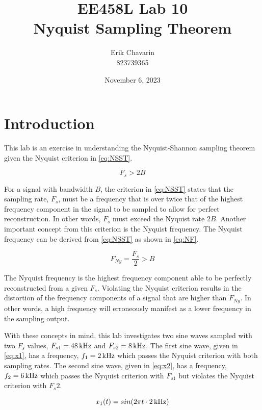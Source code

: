 \documentclass[a4paper,12pt]{article}
\title{%
  EE458L Lab 10 \\
  \large Nyquist Sampling Theorem
  }
\newcommand{\Hz}[1]{%
    \ifcase#1
        \relax
    \or
        \,\text{Hz}
    \or
        \,\text{kHz}
    \or
        \,\text{MHz}
    \or
        \,\text{GHz}
    \else
        \,\text{Invalid}
    \fi
}
\begin{document}
\author{Erik Chavarin \\ 823739365}
\date{November 6, 2023}

\maketitle
\section*{Introduction}
This lab is an exercise in understanding the Nyquist-Shannon sampling theorem given the Nyquist criterion in \cref{eq:NSST}.

\begin{equation}
    F_s > 2B
    \label{eq:NSST}
\end{equation} 

For a signal with bandwidth $B$, the criterion in \cref{eq:NSST} states that the sampling rate, $F_s$, must be a frequency that is over twice that of the highest frequency component in the signal to be sampled to allow for perfect reconstruction. In other words, $F_s$ must exceed the Nyquist rate $2B$. Another important concept from this criterion is the Nyquist frequency. The Nyquist frequency can be derived from \cref{eq:NSST} as shown in \cref{eq:NF}.

\begin{equation}
    F_{Ny} = \frac{F_s}{2} > B
    \label{eq:NF}
\end{equation} 

The Nyquist frequency is the highest frequency component able to be perfectly reconstructed from a given $F_s$. Violating the Nyquist criterion results in the distortion of the frequency components of a signal that are higher than $F_{Ny}$. In other words, a high frequency will erroneously manifest as a lower frequency in the sampling output.

With these concepts in mind, this lab investigates two sine waves sampled with two $F_s$ values, $F_{s1} = 48\Hz{2}$ and $F_{s2} = 8\Hz{2}$. The first sine wave, given in \cref{eq:x1}, has a frequency, $f_1 = 2\Hz{2}$ which passes the Nyquist criterion with both sampling rates. The second sine wave, given in \cref{eq:x2}, has a frequency, $f_2 = 6\Hz{2}$ which passes the Nyquist criterion with $F_{s1}$ but violates the Nyquist criterion with $F_s2$. 

\begin{equation}
    x_1(t) = sin(2 \pi t \cdot 2\Hz{2}) 
    \label{eq:x1}
\end{equation}
\end{document}
